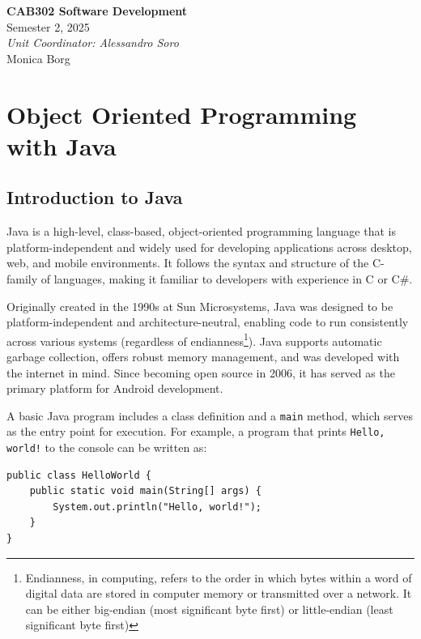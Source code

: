 \documentclass{article}
\date{}
\newcommand{\codecmd}[1]{\textcolor[rgb]{0,0.5,0}{\texttt{#1}}}
\newcommand{\unitName}{CAB302 Software Development}
\newcommand{\unitTime}{Semester 2, 2025}
\newcommand{\unitCoordinator}{Unit Coordinator: Alessandro Soro}
\newcommand{\documentAuthors}{Monica Borg}
\begin{document}
%
\begin{titlepage}
    \vspace*{\fill}
    \begin{center}
        \LARGE{\textbf{\unitName}} \\[0.1in]
        \normalsize{\unitTime} \\[0.2in]
        \normalsize\textit{\unitCoordinator} \\[0.2in]
        \documentAuthors
    \end{center}
    \vspace*{\fill}
    \thispagestyle{empty}
\end{titlepage}
\newpage
%
\tableofcontents
\newpage
%
\section{Object Oriented Programming with Java}

\subsection{Introduction to Java}
Java is a high-level, class-based, object-oriented programming language that is platform-independent and widely used for developing applications across desktop, web, and mobile environments. It follows the syntax and structure of the C-family of languages, making it familiar to developers with experience in C or C\#.

Originally created in the 1990s at Sun Microsystems, Java was designed to be platform-independent and architecture-neutral, enabling code to run consistently across various systems (regardless of endianness\footnote{Endianness, in computing, refers to the order in which bytes within a word of digital data are stored in computer memory or transmitted over a network. It can be either big-endian (most significant byte first) or little-endian (least significant byte first)}). Java supports automatic garbage collection, offers robust memory management, and was developed with the internet in mind. Since becoming open source in 2006, it has served as the primary platform for Android development.

A basic Java program includes a class definition and a \codecmd{main} method, which serves as the entry point for execution. For example, a program that prints \codecmd{Hello, world!} to the console can be written as:

\begin{verbatim}
public class HelloWorld {
    public static void main(String[] args) {
        System.out.println("Hello, world!");
    }
}
\end{verbatim}
\end{document}
